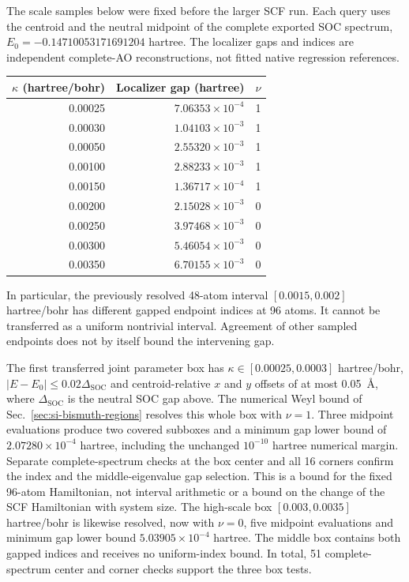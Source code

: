 \documentclass[11pt]{article}
\begin{document}
The scale samples below were fixed before the larger SCF run.
Each query uses the centroid and the neutral midpoint of the
complete exported SOC spectrum,
$E_0=-0.14710053171691204$ hartree.
The localizer gaps and indices are independent complete-AO
reconstructions, not fitted native regression references.
\begin{center}
\begin{tabular}{rrr}
\hline
$\kappa$ (hartree/bohr) & Localizer gap (hartree) & $\nu$ \\
\hline
0.00025 & $7.06353\times10^{-4}$ & 1 \\
0.00030 & $1.04103\times10^{-3}$ & 1 \\
0.00050 & $2.55320\times10^{-3}$ & 1 \\
0.00100 & $2.88233\times10^{-3}$ & 1 \\
0.00150 & $1.36717\times10^{-4}$ & 1 \\
0.00200 & $2.15028\times10^{-3}$ & 0 \\
0.00250 & $3.97468\times10^{-3}$ & 0 \\
0.00300 & $5.46054\times10^{-3}$ & 0 \\
0.00350 & $6.70155\times10^{-3}$ & 0 \\
\hline
\end{tabular}
\end{center}
In particular, the previously resolved 48-atom interval
$[0.0015,0.002]$ hartree/bohr has different gapped endpoint
indices at 96 atoms. It cannot be transferred as a uniform
nontrivial interval. Agreement of other sampled endpoints
does not by itself bound the intervening gap.

The first transferred joint parameter box has
$\kappa\in[0.00025,0.0003]$ hartree/bohr,
$|E-E_0|\leq0.02\Delta_{\mathrm{SOC}}$ and centroid-relative
$x$ and $y$ offsets of at most 0.05~\AA{}, where
$\Delta_{\mathrm{SOC}}$ is the neutral SOC gap above.
The numerical Weyl bound of Sec.~\ref{sec:si-bismuth-regions}
resolves this whole box with $\nu=1$. Three midpoint
evaluations produce two covered subboxes and a minimum gap
lower bound of $2.07280\times10^{-4}$ hartree, including the
unchanged $10^{-10}$ hartree numerical margin.
Separate complete-spectrum checks at the box center and all
16 corners confirm the index and the middle-eigenvalue gap
selection. This is a bound for the fixed 96-atom Hamiltonian,
not interval arithmetic or a bound on the change of the SCF
Hamiltonian with system size.
The high-scale box $[0.003,0.0035]$ hartree/bohr is likewise
resolved, now with $\nu=0$, five midpoint evaluations and
minimum gap lower bound $5.03905\times10^{-4}$ hartree.
The middle box contains both gapped indices and receives no
uniform-index bound. In total, 51 complete-spectrum center
and corner checks support the three box tests.
\end{document}
